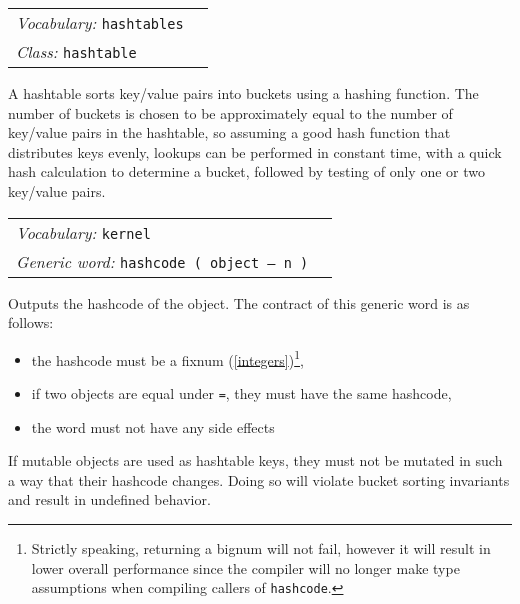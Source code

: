 \documentclass{book}
\newcommand{\vocabulary}[1]{\emph{Vocabulary:} \texttt{#1}&\\}
\newcommand{\classword}[1]{\index{\texttt{#1}}\emph{Class:} \texttt{#1}&\\}
\newcommand{\genericword}[2]{\index{\texttt{#1}}\emph{Generic word:} \texttt{#2}&\\}
\newcommand{\wordtable}[1]{


\begin{tabularx}{12cm}{lX}
\hline
#1
\hline
\end{tabularx}

}
\begin{document}
\hashglos
{}
\wordtable{
\vocabulary{hashtables}
\classword{hashtable}
}
A hashtable sorts key/value pairs into buckets using a hashing function. The number of buckets is chosen to be approximately equal to the number of key/value pairs in the hashtable, so assuming a good hash function that distributes keys evenly, lookups can be performed in constant time, with a quick hash calculation to determine a bucket, followed by testing of only one or two key/value pairs.
\wordtable{
\vocabulary{kernel}
\genericword{hashcode}{hashcode~( object -- n )}
}
Outputs the hashcode of the object. The contract of this generic word is as follows:
\begin{itemize}
\item the hashcode must be a fixnum (\ref{integers})\footnote{Strictly speaking, returning a bignum will not fail, however it will result in lower overall performance since the compiler will no longer make type assumptions when compiling callers of \texttt{hashcode}.},
\item if two objects are equal under \texttt{=}, they must have the same hashcode,
\item the word must not have any side effects
\end{itemize}
If mutable objects are used as hashtable keys, they must not be mutated in such a way that their hashcode changes. Doing so will violate bucket sorting invariants and result in undefined behavior.
\end{document}
